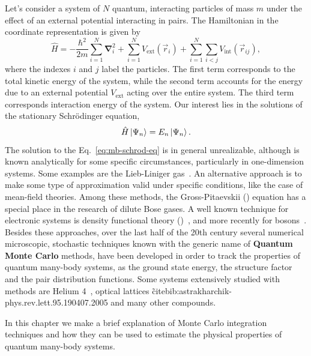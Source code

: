 Let's consider a system of $N$ quantum, interacting particles of mass $m$ under
the effect of an external potential interacting in pairs. The Hamiltonian in the
coordinate representation is given by
%
\begin{equation}
  \label{eq:many-body-hamiltonial}
  \hat H = -\frac{\hbar^2}{2m}\sum_{i=1}^{N} \mathbf{\nabla}^2_{i} +
  \sum_{i=1}^{N} V_{\mathrm{ext}}(\vec r_i) +
  \sum_{i=1}^{N} \sum_{i < j} V_{\mathrm{int}}(\vec{r}_{ij}),
\end{equation}
%
where the indexes $i$ and $j$ label the particles. The first term corresponds to
the total kinetic energy of the system, while the second term accounts for the
energy due to an external potential $V_{\mathrm{ext}}$ acting over the entire
system. The third term corresponds interaction energy of the system. Our
interest lies in the solutions of the stationary Schrödinger equation,
%
\begin{equation}
  \label{eq:mb-schrod-eq}
  {\hat{H}} \left| \Psi_n \right\rangle = E_n \left| \Psi_n \right\rangle.
\end{equation}
%
The solution to the Eq.~\eqref{eq:mb-schrod-eq} is in general unrealizable,
although is known analytically for some specific circumstances, particularly in
one-dimension systems. Some examples are the Lieb-Liniger
gas~\cite{bib:lieb-phys-rev.130.1605.1963}. An alternative approach is to make
some type of approximation valid under specific conditions, like the case of
mean-field theories. Among these methods, the Gross-Pitaevskii (\GP) equation
has a special place in the research of dilute Bose gases. A well known technique
for electronic systems is density functional theory
(\DFT)~\cite{bib:jones-rev-mod-phys.87.897.2015}, and more recently for
bosons~\cite{bib:wang-phys-rev-A.88.023626.2013,
  bib:malet-phys-rev-lett.115.033006.2015}. Besides these approaches, over the
last half of the 20th century several numerical microscopic, stochastic
techniques known with the generic name of \textbf{Quantum Monte Carlo} methods,
have been developed in order to track the properties of quantum many-body
systems, as the ground state energy, the structure factor and the pair
distribution functions. Some systems extensively studied with {\QMC} methods are
Helium 4~\cite{bib:boronat-phys-rev-B.49.8920.1994}, optical lattices
\~cite{bib:astrakharchik-phys.rev.lett.95.190407.2005} and many other compounds.

In this chapter we make a brief explanation of Monte Carlo integration
techniques and how they can be used to estimate the physical properties of
quantum many-body systems.




